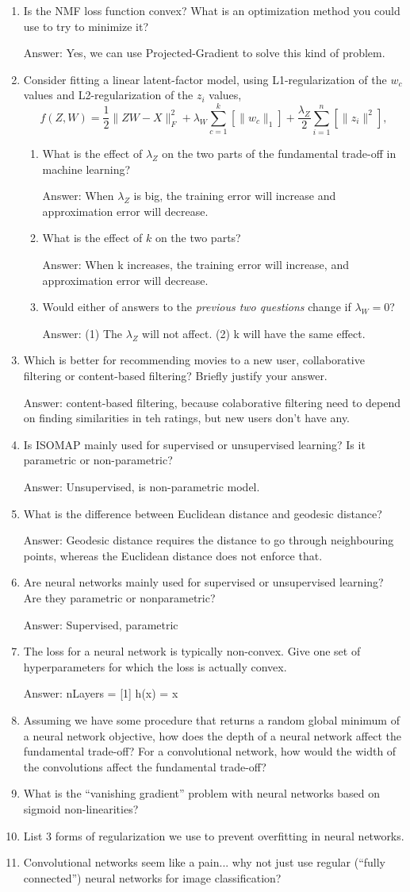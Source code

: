 \documentclass{article}
\def\ans#1{\par\gre{Answer: #1}}
\def\blu#1{{\color{blu}#1}}
\def\gre#1{{\color{gre}#1}}
\def\norm#1{\|#1\|}
\def\enum#1{\begin{enumerate}#1\end{enumerate}}
\begin{document}
\blu{
\enum{
\item Is the NMF loss function convex? What is an optimization method you could use to try to minimize it? \ans{Yes, we can use Projected-Gradient to solve this kind of problem.}
\item Consider fitting a linear latent-factor model, using L1-regularization of the $w_c$ values and L2-regularization of the $z_i$ values,
\[
f(Z,W) = \frac{1}{2}\norm{ZW - X}_F^2 + \lambda_W \sum_{c=1}^k \left[\norm{w_c}_1\right] + \frac{\lambda_Z}{2} \sum_{i=1}^n \left[\norm{z_i}^2\right],
\]
\enum{
\item What is the effect of $\lambda_Z$ on the two parts of the fundamental trade-off in machine learning? \ans{When $\lambda _Z$ is big, the training error will increase and approximation error will decrease.}
\item What is the effect of $k$ on the two parts? \ans{When k increases, the training error will increase, and approximation error will decrease.}
\item Would either of answers to the \emph{previous two questions} change if $\lambda_W = 0$? \ans{(1) The $\lambda_Z$ will not affect. (2) k will have the same effect.}
}
\item Which is better for recommending movies to a new user, collaborative filtering or content-based filtering? Briefly justify your answer.
\ans{content-based filtering, because colaborative filtering need to depend on finding similarities in teh ratings, but new users don't have any.}
\item Is ISOMAP mainly used for supervised or unsupervised learning? Is it parametric or non-parametric?
\ans{Unsupervised, is non-parametric model.}
\item What is the difference between Euclidean distance and geodesic distance?
\ans{Geodesic distance requires the distance to go through neighbouring points, whereas the Euclidean distance does not enforce that.}
\item Are neural networks mainly used for supervised or unsupervised learning? Are they parametric or nonparametric?
\ans{Supervised, parametric}
\item The loss for a neural network is typically non-convex. Give one set of hyperparameters for which the loss is actually convex.
\ans{nLayers = [1] h(x) = x}
\item Assuming we have some procedure that returns a random global minimum of a neural network objective, how does the depth of a neural network affect the fundamental trade-off? For a convolutional network, how would the width of the convolutions affect the fundamental trade-off?
\item What is the ``vanishing gradient'' problem with neural networks based on sigmoid non-linearities?
\item List 3 forms of regularization we use to prevent overfitting in neural networks.
\item Convolutional networks seem like a pain... why not just use regular (``fully connected'') neural networks for image classification?
}
}
\end{document}

